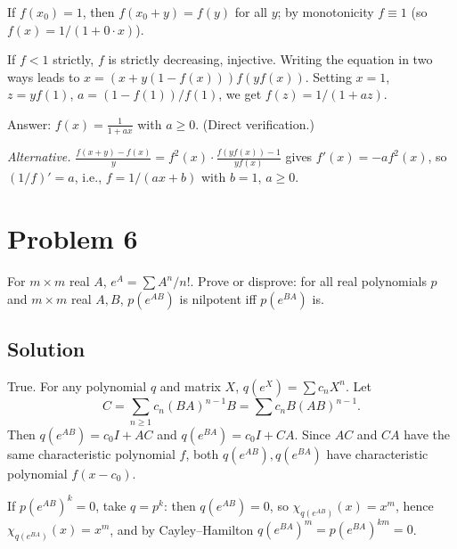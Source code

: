\documentclass{article}
\begin{document}
If $f(x_0)=1$, then $f(x_0+y)=f(y)$ for all $y$; by monotonicity $f\equiv 1$ (so $f(x)=1/(1+0\cdot x)$).

If $f<1$ strictly, $f$ is strictly decreasing, injective. Writing the equation in two ways leads to $x = (x+y(1-f(x)))f(yf(x))$. Setting $x=1$, $z=yf(1)$, $a=(1-f(1))/f(1)$, we get $f(z)=1/(1+az)$.

Answer: $f(x) = \frac{1}{1+ax}$ with $a\ge 0$. (Direct verification.)

\textit{Alternative.} $\frac{f(x+y)-f(x)}{y} = f^2(x)\cdot \frac{f(yf(x))-1}{yf(x)}$ gives $f'(x)=-a f^2(x)$, so $(1/f)'=a$, i.e., $f=1/(ax+b)$ with $b=1$, $a\ge 0$.

\section*{Problem 6}
For $m\times m$ real $A$, $e^A=\sum A^n/n!$. Prove or disprove: for all real polynomials $p$ and $m\times m$ real $A,B$, $p(e^{AB})$ is nilpotent iff $p(e^{BA})$ is.

\subsection*{Solution}
True. For any polynomial $q$ and matrix $X$, $q(e^X) = \sum c_n X^n$. Let
\[C = \sum_{n\ge 1} c_n (BA)^{n-1} B = \sum c_n B(AB)^{n-1}.\]
Then $q(e^{AB}) = c_0 I + AC$ and $q(e^{BA}) = c_0 I + CA$. Since $AC$ and $CA$ have the same characteristic polynomial $f$, both $q(e^{AB}), q(e^{BA})$ have characteristic polynomial $f(x-c_0)$.

If $p(e^{AB})^k = 0$, take $q=p^k$: then $q(e^{AB})=0$, so $\chi_{q(e^{AB})}(x)=x^m$, hence $\chi_{q(e^{BA})}(x)=x^m$, and by Cayley--Hamilton $q(e^{BA})^m=p(e^{BA})^{km}=0$.
\end{document}

